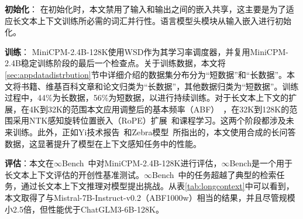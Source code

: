 \textbf{初始化}：
在初始化时，本文禁用了输入和输出之间的嵌入共享，这主要是为了适应长文本上下文训练所必需的词汇并行性。语言模型头模块从输入嵌入进行初始化。

\textbf{训练}：
MiniCPM-2.4B-128K使用WSD作为其学习率调度器，并复用MiniCPM-2.4B稳定训练阶段的最后一个检查点。关于训练数据，本文将\ref{sec:appdatadistrbution}节中详细介绍的数据集分布分为“短数据”和“长数据”。本文将书籍、维基百科文章和论文归类为“长数据”，其他数据归类为“短数据”。训练过程中，44\%为长数据，56\%为短数据，以进行持续训练。对于长文本上下文的扩展，在4K到32K的范围本文应用调整后的基本频率（ABF）~\citep{xiong2023effective}，在32K到128K的范围采用NTK感知旋转位置嵌入（RoPE）扩展~\citep{bloc97_2023_ntk}和课程学习。这两个阶段都涉及未来训练。此外，正如Yi技术报告~\citep{young2024yi}和Zebra模型~\citep{song2023zebra}所指出的，本文使用合成的长问答数据，这显著提升了模型在上下文感知任务中的性能。

\textbf{评估}：本文在$\infty$Bench~\citep{zhang2024infty}中对MiniCPM-2.4B-128K进行评估，$\infty$Bench是一个用于长文本上下文评估的开创性基准测试。$\infty$Bench~\citep{zhang2024infty}中的任务超越了典型的检索任务，通过长文本上下文推理对模型提出挑战。从表\ref{tab:longcontext}中可以看到，本文取得了与Mistral-7B-Instruct-v0.2（ABF1000w）相当的结果，并且尽管规模小2.5倍，但性能优于ChatGLM3-6B-128K。 

